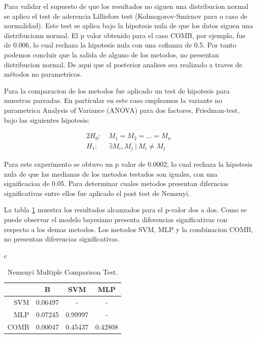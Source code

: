 \documentclass[12pt]{article}
\begin{document}
Para validar el supuesto de que los resultados no siguen una distribucion normal se aplico el test de aderencia  Lilliefors test (Kolmogorov-Smirnov para o caso de normalidad). Este test se aplica bajo la hipotesis nula de que los datos siguen una distribucionn normal. El p valor obtenido para el caso COMB, por ejemplo, fue de 0.006, lo cual rechaza la hipotesis nula con una cofianza de 0.5. Por tanto podemos concluir que la salida de alguno de los metodos, no presentan distribucion normal. De aqui que el posterior analises sea realizado a traves de métodos no parametricos. 


Para la comparacion de los metodos fue aplicado un test de hipotesis para muestras pareadas. En particular en este caso empleamos la variante no parametrica Analysis of Variance (ANOVA) para dos factores, Friedman-test, bajo las siguientes hipotesis:

\begin{alignat*}{2}
  H_0:  & \ M_1 = M_2 = ... =M_n \\
  H_1:  & \ \exists M_i,M_j \ | \ M_i\neq M_j
\end{alignat*}

Para este experimento se obtuvo un p valor de 0.0002, lo cual rechaza la hipotesis nula de que las medianas de los metodos testados son iguales, con una significacioa de 0.05. Para determinar cuales metodos presentan diferncias significativas entre ellos fue aplicado el post test de Nemenyi. 

La tabla \ref{tab:test_nemeyi} muestra los resultados alcanzados para el p-valor dos a dos. Como se puede observar el modelo bayesiano presenta diferencias significativas con respecto a los demas metodos. Los metodos SVM, MLP y la combinacion COMB, no presentan diferencias significativas. 

\begin{table}[!h]
\renewcommand{\arraystretch}{1.3}
\caption{Nemenyi Multiple Comparison Test. }
\label{tab:test_nemeyi}
\centering
\begin{tabular}{c}
\begin{tabular}{rccc}
\hline
    &B       &SVM     &MLP         \\    
\hline                             
SVM &0.06497 &-       &-           \\  
MLP &0.07245 &0.99997 &-           \\
COMB &0.00047 &0.45437 &0.42808    \\
\hline 
\end{tabular}\\
\end{tabular}
\end{table}
\end{document}
